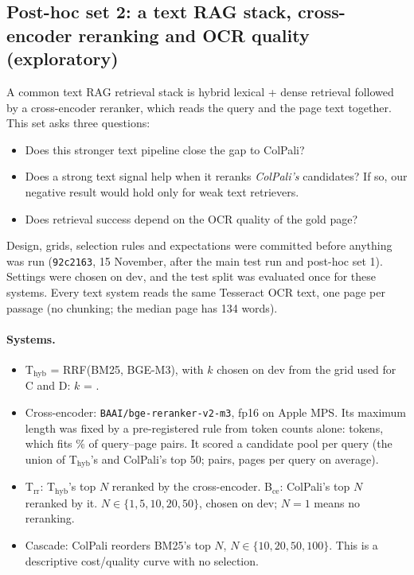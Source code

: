 \documentclass[11pt,a4paper]{article}
\newcommand{\lbl}[2]{\textsf{\scriptsize\textcolor{#1}{[#2]}}}
\newcommand{\Mea}{\lbl{tagM}{Measured}}
\newcommand{\file}[1]{\texttt{\small\hyphenchar\font=`\/ #1}}
\begin{document}
\begin{table}[!htbp]\centering\small

\caption{\Mea{} Post-hoc extensions on the test split (\file{results/posthoc\_extensions/metrics.json}).}\label{tab:posthoc}
\end{table}

\subsection{Post-hoc set 2: a text RAG stack, cross-encoder reranking and OCR quality (exploratory)}
\label{sec:posthoc2}
A common text RAG retrieval stack is hybrid lexical + dense retrieval followed by a cross-encoder reranker, which reads the query and the page text together. This set asks three questions:
\begin{itemize}
  \item Does this stronger text pipeline close the gap to ColPali?
  \item Does a strong text signal help when it reranks \emph{ColPali's} candidates? If so, our negative result would hold only for weak text retrievers.
  \item Does retrieval success depend on the OCR quality of the gold page?
\end{itemize}
Design, grids, selection rules and expectations were committed before anything was run (\texttt{92c2163}, 15 November, after the main test run and post-hoc set 1). Settings were chosen on dev, and the test split was evaluated once for these systems. Every text system reads the same Tesseract OCR text, one page per passage (no chunking; the median page has 134 words).

\paragraph{Systems.}
\begin{itemize}
  \item T$_\text{hyb}$ = RRF(BM25, BGE-M3), with $k$ chosen on dev from the grid used for C and D: $k$ = \kThyb{}.
  \item Cross-encoder: \texttt{BAAI/bge-reranker-v2-m3}, fp16 on Apple MPS. Its maximum length was fixed by a pre-registered rule from token counts alone: \ceMaxLen{} tokens, which fits \ceFitPct{}\% of query--page pairs. It scored a candidate pool per query (the union of T$_\text{hyb}$'s and ColPali's top 50; \cePairs{} pairs, \cePoolMean{} pages per query on average).
  \item T$_\text{rr}$: T$_\text{hyb}$'s top $N$ reranked by the cross-encoder. B$_\text{ce}$: ColPali's top $N$ reranked by it. $N \in \{1, 5, 10, 20, 50\}$, chosen on dev; $N = 1$ means no reranking.
  \item Cascade: ColPali reorders BM25's top $N$, $N \in \{10, 20, 50, 100\}$. This is a descriptive cost/quality curve with no selection.
\end{itemize}
\end{document}

